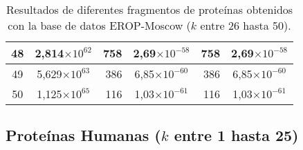\begin{table}[!hbt]
\begin{tabular}{| c  r  r  c  r  c |}
    48 & \multicolumn{1}{c}{2,814$\times 10^{62}$} & 758 & 2,69$\times 10^{-58}$ & 758 & 2,69$\times 10^{-58}$ \\ \hline  
    49 & \multicolumn{1}{c}{5,629$\times 10^{63}$} & 386 & 6,85$\times 10^{-60}$ & 386 & 6,85$\times 10^{-60}$ \\ \hline
    50 & \multicolumn{1}{c}{1,125$\times 10^{65}$} & 116 & 1,03$\times 10^{-61}$ & 116 & 1,03$\times 10^{-61}$ \\ \hline       
    \end{tabular}
    \caption{Resultados de diferentes fragmentos de proteínas obtenidos con la base de datos EROP-Moscow ($k$ entre 26 hasta 50).}
    \label{tb:labela32}
\end{table}

\newpage

\subsection*{Proteínas Humanas ($k$ entre 1 hasta 25)}

